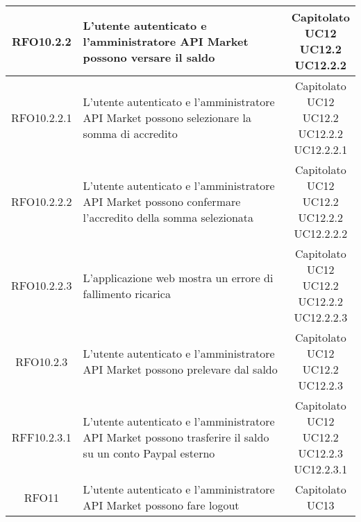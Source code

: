\begin{longtable}{|c|p{8cm}|c|}
RFO10.2.2 &  L'utente autenticato e l'amministratore API Market possono versare il saldo & \makecell*{Capitolato\\UC12\\UC12.2\\UC12.2.2} \\
\hline

RFO10.2.2.1 &  L'utente autenticato e l'amministratore API Market possono selezionare la somma di accredito & \makecell*{Capitolato\\UC12\\UC12.2\\UC12.2.2\\UC12.2.2.1} \\
\hline

RFO10.2.2.2 &  L'utente autenticato e l'amministratore API Market possono confermare l'accredito della somma selezionata & \makecell*{Capitolato\\UC12\\UC12.2\\UC12.2.2\\UC12.2.2.2} \\
\hline

RFO10.2.2.3 &  L'applicazione web mostra un errore di fallimento ricarica & \makecell*{Capitolato\\UC12\\UC12.2\\UC12.2.2\\UC12.2.2.3} \\
\hline

RFO10.2.3 &  L'utente autenticato e l'amministratore API Market possono prelevare dal saldo & \makecell*{Capitolato\\UC12\\UC12.2\\UC12.2.3} \\
\hline

RFF10.2.3.1 &  L'utente autenticato e l'amministratore API Market possono trasferire il saldo su un conto Paypal esterno & \makecell*{Capitolato\\UC12\\UC12.2\\UC12.2.3\\UC12.2.3.1} \\
\hline

RFO11 &  L'utente autenticato e l'amministratore API Market possono fare logout & \makecell*{Capitolato\\UC13} \\
\hline


\end{longtable}
